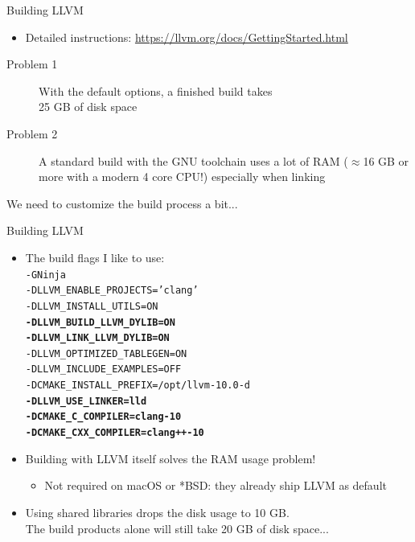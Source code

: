 \begin{frame}{Building LLVM}
\begin{itemize}
\item Detailed instructions: \url{https://llvm.org/docs/GettingStarted.html}
\end{itemize}
\bigskip
\begin{description}
\item[Problem 1] With the \alert{default options}, a finished build takes\\\alert{25 GB of disk space}
\item[Problem 2] A standard build with the GNU toolchain uses \alert{a lot of RAM} ($\approx$16 GB or more with a modern 4 core CPU!) especially when linking
\end{description}
\bigskip
We need to customize the build process a bit...
\end{frame}


\begin{frame}{Building LLVM}
\begin{itemize}
\item The build flags I like to use:\\
\smallskip\texttt{\small-GNinja \\
-DLLVM\_ENABLE\_PROJECTS='clang' \\
-DLLVM\_INSTALL\_UTILS=ON \\
\textbf{-DLLVM\_BUILD\_LLVM\_DYLIB=ON \\
-DLLVM\_LINK\_LLVM\_DYLIB=ON} \\
-DLLVM\_OPTIMIZED\_TABLEGEN=ON \\
-DLLVM\_INCLUDE\_EXAMPLES=OFF \\
-DCMAKE\_INSTALL\_PREFIX=/opt/llvm-10.0-d \\
\textbf{-DLLVM\_USE\_LINKER=lld \\
-DCMAKE\_C\_COMPILER=clang-10 \\
-DCMAKE\_CXX\_COMPILER=clang++-10} \\
}
\item Building with LLVM itself solves the RAM usage problem!
	\begin{itemize}
	\item Not required on macOS or *BSD: they already ship LLVM as default
	\end{itemize}
\item Using \alert{shared libraries} drops the disk usage to \alert{10 GB}.\\
{\footnotesize The build products alone will still take 20 GB of disk space...}
\end{itemize}
\end{frame}


